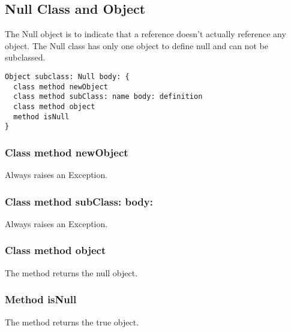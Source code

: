 \subsection {Null Class and Object}

The Null object is to indicate that a reference doesn't actually reference
any object. The Null class has only one object to define null and can not
be subclassed.

\begin{lstlisting}
Object subclass: Null body: {
  class method newObject
  class method subClass: name body: definition
  class method object
  method isNull
}
\end{lstlisting}

\subsubsection{Class method newObject}
Always raises an Exception.

\subsubsection{Class method subClass: body:}
Always raises an Exception.

\subsubsection{Class method object}
The method returns the null object.

\subsubsection{Method isNull}
The method returns the true object.
